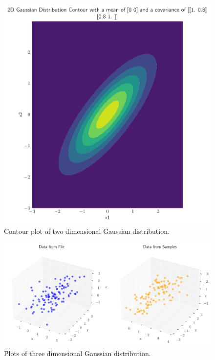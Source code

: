 \documentclass{CPSReport}
\begin{document}
\begin{figure}[ht]
    \begin{center}
        \includegraphics[width=1\linewidth]{../gaussian2D_contour.pdf}
    \end{center}
    \caption{Contour plot of two dimensional Gaussian distribution.}
    \label{fig:3}
\end{figure}

\begin{figure}[ht]
    \begin{center}
        \includegraphics[width=1\linewidth]{../gaussian3D.pdf}
    \end{center}
    \caption{Plots of three dimensional Gaussian distribution.}
    \label{fig:4}
\end{figure}
\end{document}
